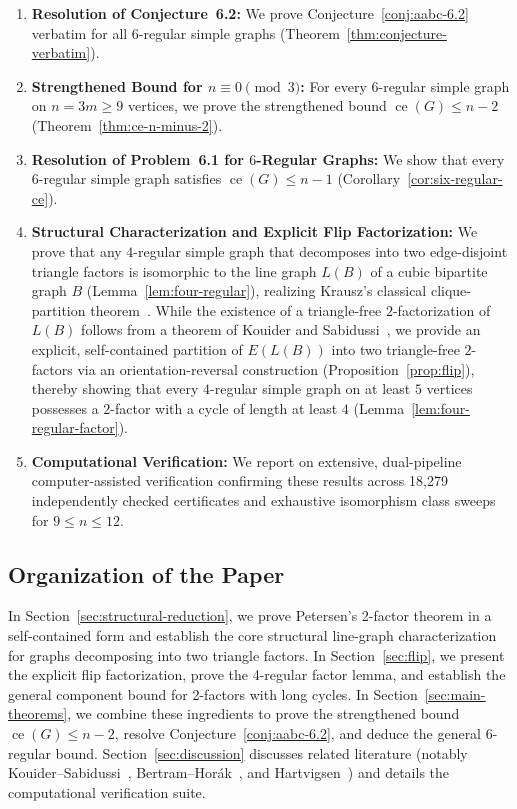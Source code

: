 \documentclass[11pt,reqno]{amsart}
\theoremstyle{definition}
\theoremstyle{remark}
\DeclareMathOperator{\ce}{ce}
\begin{document}
\begin{enumerate}[(1)]
    \item \textbf{Resolution of Conjecture~6.2:} We prove Conjecture~\ref{conj:aabc-6.2} verbatim for all $6$-regular simple graphs (Theorem~\ref{thm:conjecture-verbatim}).
    \item \textbf{Strengthened Bound for $n \equiv 0 \pmod 3$:} For every $6$-regular simple graph on $n = 3m \ge 9$ vertices, we prove the strengthened bound $\ce(G) \le n-2$ (Theorem~\ref{thm:ce-n-minus-2}).
    \item \textbf{Resolution of Problem~6.1 for $6$-Regular Graphs:} We show that every $6$-regular simple graph satisfies $\ce(G) \le n-1$ (Corollary~\ref{cor:six-regular-ce}).
    \item \textbf{Structural Characterization and Explicit Flip Factorization:} We prove that any $4$-regular simple graph that decomposes into two edge-disjoint triangle factors is isomorphic to the line graph $L(B)$ of a cubic bipartite graph $B$ (Lemma~\ref{lem:four-regular}), realizing Krausz's classical clique-partition theorem~\cite{Krausz43}. While the existence of a triangle-free $2$-factorization of $L(B)$ follows from a theorem of Kouider and Sabidussi~\cite{KS95}, we provide an explicit, self-contained partition of $E(L(B))$ into two triangle-free $2$-factors via an orientation-reversal construction (Proposition~\ref{prop:flip}), thereby showing that every $4$-regular simple graph on at least $5$ vertices possesses a $2$-factor with a cycle of length at least $4$ (Lemma~\ref{lem:four-regular-factor}).
    \item \textbf{Computational Verification:} We report on extensive, dual-pipeline computer-assisted verification confirming these results across 18,279 independently checked certificates and exhaustive isomorphism class sweeps for $9 \le n \le 12$.
\end{enumerate}

\subsection*{Organization of the Paper}
In Section~\ref{sec:structural-reduction}, we prove Petersen's 2-factor theorem in a self-contained form and establish the core structural line-graph characterization for graphs decomposing into two triangle factors. In Section~\ref{sec:flip}, we present the explicit flip factorization, prove the 4-regular factor lemma, and establish the general component bound for 2-factors with long cycles. In Section~\ref{sec:main-theorems}, we combine these ingredients to prove the strengthened bound $\ce(G) \le n-2$, resolve Conjecture~\ref{conj:aabc-6.2}, and deduce the general $6$-regular bound. Section~\ref{sec:discussion} discusses related literature (notably Kouider--Sabidussi~\cite{KS95}, Bertram--Hor\'ak~\cite{BH97}, and Hartvigsen~\cite{Hartvigsen24}) and details the computational verification suite.
\end{document}
